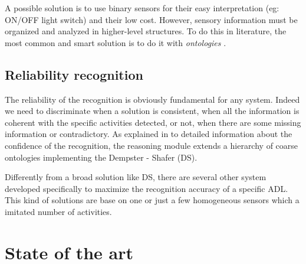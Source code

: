 \documentclass{thesisreport}
\begin{document}
A possible solution is to use binary sensors for their easy interpretation (eg: ON/OFF light switch) and their low cost. However, sensory information must be organized and analyzed in higher-level structures. To do this in literature, the most common and smart solution is to do it with \textit{ontologies} \cite{buoncompagni2017towards}.

\section{Reliability recognition}
The reliability of the recognition is obviously fundamental for any system. Indeed we need to discriminate when a solution is consistent, when all the information is coherent with the specific activities detected, or not, when there are some missing information or contradictory.
As explained in \cite{sentz2002combination} to detailed information about the confidence of the recognition, the reasoning module extends a hierarchy of coarse ontologies implementing the Dempster - Shafer (DS). 

Differently from a broad solution like DS, there are several other system developed specifically to maximize the recognition accuracy of a specific ADL. This kind of solutions are base on one or just a few homogeneous sensors which a imitated number of activities.  

 \chapter{State of the art}
 
 

  
 
\end{document}
